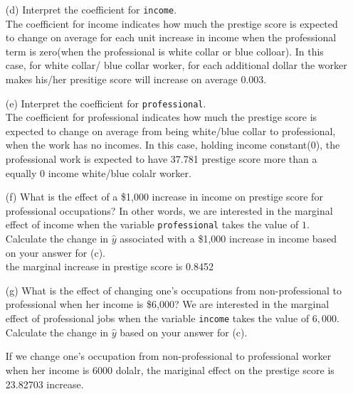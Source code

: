 \documentclass[12pt,letterpaper]{article}
\begin{document}
\begin{enumerate}
	\item [(d)]
	Interpret the coefficient for \texttt{income}.\\
The coefficient for income indicates how much the prestige score is expected to change on average for each unit increase in income when the professional term is zero(when the professional is white collar or blue colloar). In this case, for white collar/ blue collar worker, for each additional dollar the worker makes his/her presitige score will increase on average 0.003.

	\item [(e)]
	Interpret the coefficient for \texttt{professional}.\\
The coefficient for professional  indicates how much the prestige score is expected to change on average from being white/blue collar to professional, when the work has no incomes. In this case, holding income constant(0), the professional work is expected to have 37.781 prestige score more than a equally 0 income white/blue colalr worker.
	

	\item [(f)]
	What is the effect of a \$1,000 increase in income on prestige score for professional occupations? In other words, we are interested in the marginal effect of income when the variable \texttt{professional} takes the value of $1$. Calculate the change in $\hat{y}$ associated with a \$1,000 increase in income based on your answer for (c).\\
  
the marginal increase in prestige score is 0.8452
	
	
	\item [(g)]
	What is the effect of changing one's occupations from non-professional to professional when her income is \$6,000? We are interested in the marginal effect of professional jobs when the variable \texttt{income} takes the value of $6,000$. Calculate the change in $\hat{y}$ based on your answer for (c).
  	
	If we change one's occupation from non-professional to professional worker when her income is 6000 dolalr, the mariginal effect on the prestige score is 23.82703 increase.
\end{enumerate}

\newpage
\end{document}
